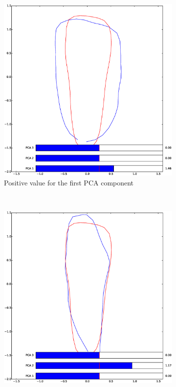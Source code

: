 \documentclass[a4paper,10pt]{article}
\begin{document}
\begin{figure}[htbp]
	\centering
	\begin{subfigure}{0.30\textwidth}
		\centering
		\includegraphics[width=\textwidth, trim=0cm 2.5cm 0cm 3cm, clip]{pca1_pos}
		\caption{Positive value for the first PCA component}
	\end{subfigure}
	~
	\begin{subfigure}{0.30\textwidth}
		\centering
		\includegraphics[width=\textwidth, trim=0cm 2.5cm 0cm 3cm, clip]{pca2_pos}

\end{subfigure}
\end{figure}
\end{document}
